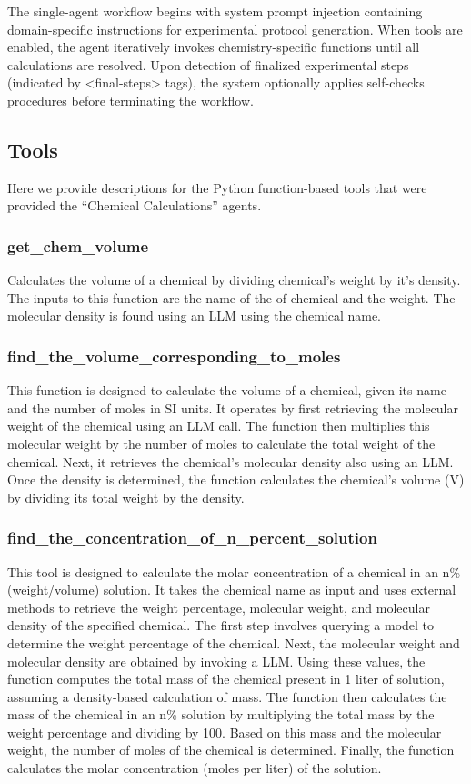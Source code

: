 \documentclass[sn-nature, twocolumn]{sn-jnl}%
\theoremstyle{thmstyleone}%
\theoremstyle{thmstyletwo}%
\theoremstyle{thmstylethree}%
\begin{document}
The single-agent workflow begins with system prompt injection containing domain-specific instructions for experimental protocol generation. When tools are enabled, the agent iteratively invokes chemistry-specific functions until all calculations are resolved. Upon detection of finalized experimental steps (indicated by <final-steps> tags), the system optionally applies self-checks procedures before terminating the workflow.


\subsection{Tools}

Here we provide descriptions for the Python function-based tools that were provided the ``Chemical Calculations'' agents.

\subsubsection*{get\_chem\_volume} Calculates the volume of a chemical by dividing chemical's weight by it's density. The inputs to this function are the name of the of chemical and the weight. The molecular density is found using an LLM using the chemical name.

\subsubsection*{find\_the\_volume\_corresponding\_to\_moles}
This function is designed to calculate the volume of a chemical, given its name and the number of moles in SI units. It operates by first retrieving the molecular weight  of the chemical using an LLM call. The function then multiplies this molecular weight by the number of moles to calculate the total weight of the chemical. Next, it retrieves the chemical's molecular density also using an LLM. Once the density is determined, the function calculates the chemical's volume (V) by dividing its total weight by the density.

\subsubsection*{find\_the\_concentration\_of\_n\_percent\_solution} 
This tool is designed to calculate the molar concentration of a chemical in an n\% (weight/volume) solution. It takes the chemical name as input and uses external methods to retrieve the weight percentage, molecular weight, and molecular density of the specified chemical. The first step involves querying a model to determine the weight percentage of the chemical. Next, the molecular weight and molecular density are obtained by invoking a LLM. Using these values, the function computes the total mass of the chemical present in 1 liter of solution, assuming a density-based calculation of mass. The function then calculates the mass of the chemical in an n\% solution by multiplying the total mass by the weight percentage and dividing by 100. Based on this mass and the molecular weight, the number of moles of the chemical is determined. Finally, the function calculates the molar concentration (moles per liter) of the solution.
\end{document}
